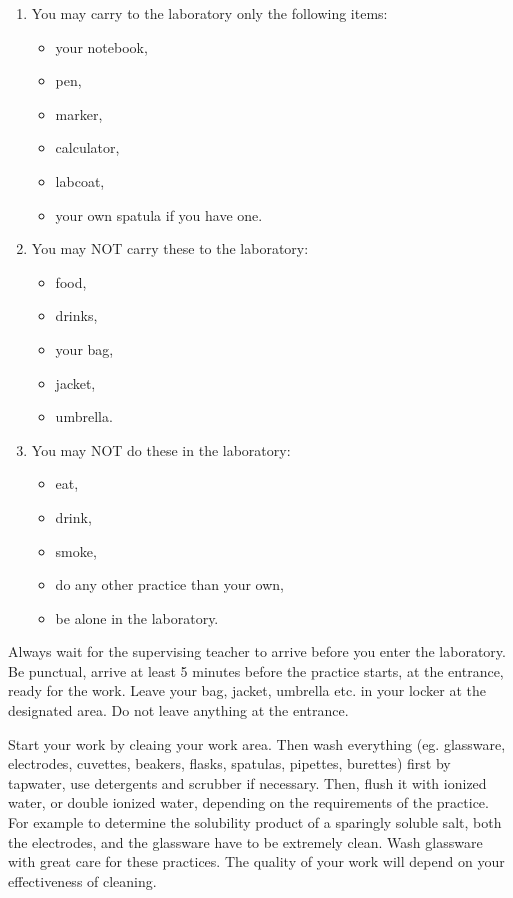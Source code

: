 \documentclass{article}
\begin{document}
\begin{enumerate}
\item You may carry to the laboratory only the following items:
	\begin{itemize}
	\item your notebook,
	\item pen,
	\item marker,
	\item calculator,
	\item labcoat,
	\item your own spatula if you have one.
	\end{itemize}
\item You may NOT carry these to the laboratory:
	\begin{itemize}
	\item food,
	\item drinks,
	\item your bag,
	\item jacket,
	\item umbrella.
	\end{itemize}
\item You may NOT do these in the laboratory:
	\begin{itemize}
	\item eat,
	\item drink,
	\item smoke,
	\item do any other practice than your own,
	\item be alone in the laboratory.
	\end{itemize}
\end{enumerate}

Always wait for the supervising teacher to arrive before you enter the laboratory. Be punctual, arrive at least 5 minutes before the practice starts, at the entrance, ready for the work. Leave your bag, jacket, umbrella etc. in your locker at the designated area. Do not leave anything at the entrance.
	
Start your work by cleaing your work area. Then wash everything (eg. glassware, electrodes, cuvettes, beakers, flasks, spatulas, pipettes, burettes) first by tapwater, use detergents and scrubber if necessary. Then, flush it with ionized water, or double ionized water, depending on the requirements of the practice. For example to determine the solubility product of a sparingly soluble salt, both the electrodes, and the glassware have to be extremely clean. Wash glassware with great care for these practices. The quality of your work will depend on your effectiveness of cleaning.
\end{document}

